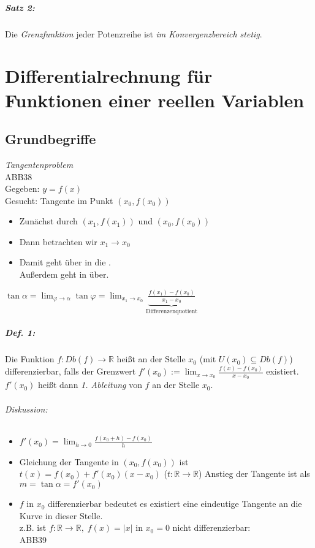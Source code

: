\paragraph{Satz 2:} Die \emph{Grenzfunktion} jeder Potenzreihe ist \emph{im Konvergenzbereich stetig}.

\chapter{Differentialrechnung für Funktionen einer reellen Variablen}
\section{Grundbegriffe}
\emph{Tangentenproblem}\\
ABB38\\
Gegeben: $y=f(x)$\\
Gesucht: Tangente im Punkt $(x_0, f(x_0))$
\begin{itemize}
\item Zunächst  durch $(x_1, f(x_1))$ und $(x_0, f(x_0))$
\item Dann betrachten wir $x_1 \to x_0$
\item Damit geht  über in die .\\
Außerdem geht \tgreen{$\varphi$} in \torange{$\alpha$} über.
\end{itemize}
$\tan \alpha = \lim_{\varphi \to \alpha} \tan \varphi = \lim_{x_1\to x_0} \underbrace{\frac{f(x_1)-f(x_0)}{x_1-x_0}}_{\text{Differenzenquotient}}$

\paragraph{Def. 1:} Die Funktion $f:Db(f) \to \mathbb{R}$ heißt an der Stelle $x_0$ (mit $U(x_0)\subseteq Db(f)$) differenzierbar, falls der Grenzwert $\boxed{f'(x_0):=\lim_{x\to x_0} \frac{f(x)-f(x_0)}{x-x_0}}$ existiert.\\
$f'(x_0)$ heißt dann \emph{1. Ableitung} von $f$ an der Stelle $x_0$.

\subparagraph{Diskussion:}
\begin{itemize}
\item $f'(x_0)=\lim_{h\to 0} \frac{f(x_0+h)-f(x_0)}{h}$
\item Gleichung der Tangente in $(x_0, f(x_0)) $ ist $t(x)=f(x_0)+f'(x_0)(x-x_0)$ ($t: \mathbb{R}\to \mathbb{R}$)
Anstieg der Tangente ist als $m=\tan \alpha = f'(x_0)$
\item $f$ in $x_0$ differenzierbar bedeutet es existiert eine eindeutige Tangente an die Kurve in dieser Stelle.\\
z.B. ist $f: \mathbb{R}\to \mathbb{R}, \; f(x) = |x|$ in $x_0=0$ nicht differenzierbar:\\
ABB39
\end{itemize}

